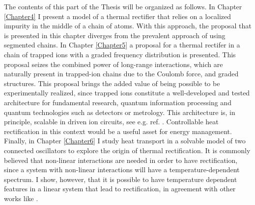 The contents of this part of the Thesis will be organized as follows. In Chapter \ref{Chapter4} I present a model of a thermal rectifier that relies on a localized impurity in the middle of a chain of atoms. With this approach, the proposal that is presented in this chapter diverges from the prevalent approach of using segmented chains. In Chapter \ref{Chapter5} a proposal for a thermal rectifer in a chain of trapped ions with a graded frequency distribution is presented. This proposal seizes the combined power of long-range interactions, which are naturally present in trapped-ion chains due to the Coulomb force, and graded structures. This proposal brings the added value of being possible to be experimentally realized, since trapped ions constitute a well-developed and tested  architecture for fundamental research, quantum information processing and quantum technologies such as detectors or metrology. This architecture is, in principle, scalable in driven ion circuits, see e.g. ref. \cite{Bruzewicz2019}. Controllable heat rectification in this context
would be a useful asset for energy management. Finally, in Chapter \ref{Chapter6} I study heat transport in a solvable model of two connected oscillators to explore the origin of thermal rectification. It is commonly believed that non-linear interactions are needed in order to have rectification, since a system with non-linear interactions will have a temperature-dependent spectrum. I show, however, that it is possible to have temperature dependent features in a linear system that lead to rectification, in agreement with other works like \cite{Pereira2017}.


